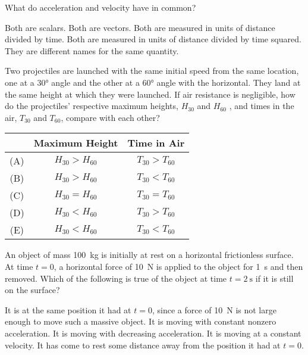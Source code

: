 \documentclass[12pt]{exam}
\begin{document}
\begin{questions}
  \question What do acceleration and velocity have in common?
  \begin{choices}
    \choice Both are scalars.
    \choice Both are vectors.
    \choice Both are measured in units of distance divided by time.
    \choice Both are measured in units of distance divided by time squared.
    \choice They are different names for the same quantity.
  \end{choices}

  \question Two projectiles are launched with the same initial speed from the
  same location, one at a \ang{30} angle and the other at a \ang{60} angle with
  the horizontal. They land at the same height at which they were launched. If
  air resistance is negligible, how do the projectiles' respective maximum
  heights, $H_{30}$ and $H_{60}$ , and times in the air, $T_{30}$ and $T_{60}$,
  compare with each other?

  \begin{tabular}{ccc}
    & Maximum Height & Time in Air \\ \hline
    (A) & $H_{30} > H_{60}$ & $T_{30} > T_{60}$ \\
    (B) & $H_{30} > H_{60}$ & $T_{30} < T_{60}$ \\
    (C) & $H_{30} = H_{60}$ & $T_{30} = T_{60}$ \\
    (D) & $H_{30} < H_{60}$ & $T_{30} > T_{60}$ \\
    (E) & $H_{30} < H_{60}$ & $T_{30} < T_{60}$
  \end{tabular}

  \question An object of mass \SI{100}{\kilo\gram} is initially at rest on a
  horizontal frictionless surface. At time $t=0$, a horizontal force of
  \SI{10}{\newton} is applied to the object for \SI{1}{\second} and then
  removed. Which of the following is true of the object at time
  $t=\SI{2}{\second}$ if it is still on the surface?
  \begin{choices}
    \choice It is at the same position it had at $t=0$, since a force of
    \SI{10}{\newton} is not large enough to move such a massive object.
    \choice It is moving with constant nonzero acceleration.
    \choice It is moving with decreasing acceleration.
    \choice It is moving at a constant velocity.
    \choice It has come to rest some distance away from the position it had at
    $t=0$.
  \end{choices}
  

\end{questions}
\end{document}
